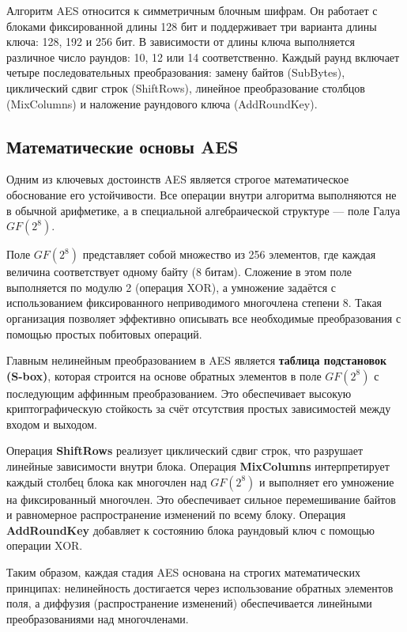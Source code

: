 Алгоритм AES относится к симметричным блочным шифрам. Он работает с блоками фиксированной длины 128 бит и поддерживает три варианта длины ключа: 128, 192 и 256 бит. В зависимости от длины ключа выполняется различное число раундов: 10, 12 или 14 соответственно. Каждый раунд включает четыре последовательных преобразования: замену байтов (SubBytes), циклический сдвиг строк (ShiftRows), линейное преобразование столбцов (MixColumns) и наложение раундового ключа (AddRoundKey).  

\subsection{Математические основы AES}

Одним из ключевых достоинств AES является строгое математическое обоснование его устойчивости. Все операции внутри алгоритма выполняются не в обычной арифметике, а в специальной алгебраической структуре — поле Галуа $GF(2^8)$.  

Поле $GF(2^8)$ представляет собой множество из 256 элементов, где каждая величина соответствует одному байту (8 битам). Сложение в этом поле выполняется по модулю 2 (операция XOR), а умножение задаётся с использованием фиксированного неприводимого многочлена степени 8. Такая организация позволяет эффективно описывать все необходимые преобразования с помощью простых побитовых операций.  

Главным нелинейным преобразованием в AES является \textbf{таблица подстановок (S-box)}, которая строится на основе обратных элементов в поле $GF(2^8)$ с последующим аффинным преобразованием. Это обеспечивает высокую криптографическую стойкость за счёт отсутствия простых зависимостей между входом и выходом.  

Операция \textbf{ShiftRows} реализует циклический сдвиг строк, что разрушает линейные зависимости внутри блока.  
Операция \textbf{MixColumns} интерпретирует каждый столбец блока как многочлен над $GF(2^8)$ и выполняет его умножение на фиксированный многочлен. Это обеспечивает сильное перемешивание байтов и равномерное распространение изменений по всему блоку.  
Операция \textbf{AddRoundKey} добавляет к состоянию блока раундовый ключ с помощью операции XOR.  

Таким образом, каждая стадия AES основана на строгих математических принципах: нелинейность достигается через использование обратных элементов поля, а диффузия (распространение изменений) обеспечивается линейными преобразованиями над многочленами.  

